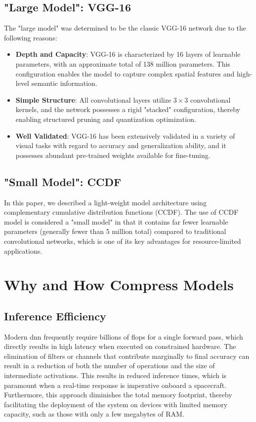     \subsection{"Large Model": VGG-16}
    The "large model" was determined to be the classic VGG-16 network due to the following reasons:
    \begin{itemize}
      \item \textbf{Depth and Capacity}: VGG-16 is characterized by 16 layers of learnable parameters, with an approximate total of 138 million parameters. This configuration enables the model to capture complex spatial features and high-level semantic information.
      \item \textbf{Simple Structure}: All convolutional layers utilize $3\times3$ convolutional kernels, and the network possesses a rigid "stacked" configuration, thereby enabling structured pruning and quantization optimization.
      \item \textbf{Well Validated}: VGG-16 has been extensively validated in a variety of visual tasks with regard to accuracy and generalization ability, and it possesses abundant pre-trained weights available for fine-tuning.
    \end{itemize}
    
    \subsection{"Small Model": CCDF}
    In this paper, we described a light-weight model architecture using complementary cumulative distribution functions (CCDF). The use of CCDF model is considered a "small model" in that it contains far fewer learnable parameters (generally fewer than 5 million total) compared to traditional convolutional networks, which is one of its key advantages for resource-limited applications.








\section{Why and How Compress Models}
    \subsection{Inference Efficiency}
    Modern \gls{dnn} frequently require billions of \gls{flops} for a single forward pass, which directly results in high latency when executed on constrained hardware. The elimination of filters or channels that contribute marginally to final accuracy can result in a reduction of both the number of operations and the size of intermediate activations. This results in reduced inference times, which is paramount when a real-time response is imperative onboard a spacecraft. Furthermore, this approach diminishes the total memory footprint, thereby facilitating the deployment of the system on devices with limited memory capacity, such as those with only a few megabytes of RAM.
    
